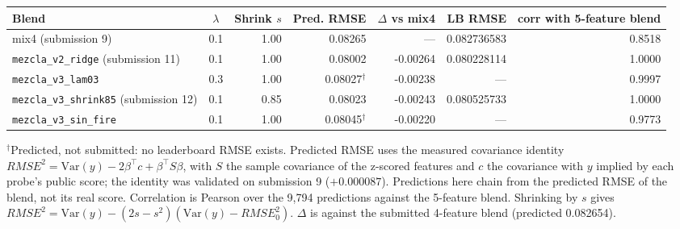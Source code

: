 \begin{tabular}{lcrrrrr}
\toprule
Blend & $\lambda$ & Shrink $s$ & Pred. RMSE & $\Delta$ vs mix4 & LB RMSE & corr with 5-feature blend \\
\midrule
mix4 (submission 9) & 0.1 & 1.00 & 0.08265 & --- & 0.082736583 & 0.8518 \\
\texttt{mezcla\_v2\_ridge} (submission 11) & 0.1 & 1.00 & 0.08002 & -0.00264 & 0.080228114 & 1.0000 \\
\texttt{mezcla\_v3\_lam03} & 0.3 & 1.00 & 0.08027$^{\dagger}$ & -0.00238 & --- & 0.9997 \\
\texttt{mezcla\_v3\_shrink85} (submission 12) & 0.1 & 0.85 & 0.08023 & -0.00243 & 0.080525733 & 1.0000 \\
\texttt{mezcla\_v3\_sin\_fire} & 0.1 & 1.00 & 0.08045$^{\dagger}$ & -0.00220 & --- & 0.9773 \\
\bottomrule
\end{tabular}

\par\smallskip\footnotesize $^{\dagger}$Predicted, not submitted: no leaderboard RMSE exists. Predicted RMSE uses the measured covariance identity $RMSE^2=\mathrm{Var}(y)-2\beta^{\top}c+\beta^{\top}S\beta$, with $S$ the sample covariance of the z-scored features and $c$ the covariance with $y$ implied by each probe's public score; the identity was validated on submission 9 ($+0.000087$). Predictions here chain from the predicted RMSE of the blend, not its real score. Correlation is Pearson over the 9{,}794 predictions against the 5-feature blend. Shrinking by $s$ gives $RMSE^2=\mathrm{Var}(y)-(2s-s^2)(\mathrm{Var}(y)-RMSE_0^2)$. $\Delta$ is against the submitted 4-feature blend (predicted 0.082654).